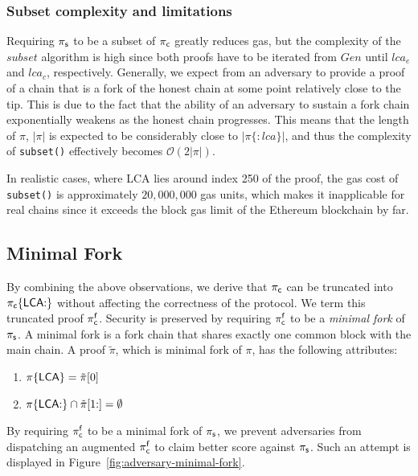 

\subsubsection{Subset complexity and limitations}

Requiring $\mathsf{\pi_{s}}$ to be a subset of $\mathsf{\pi_{c}}$ greatly reduces gas, but
the complexity of the $subset$ algorithm is high since both proofs have to be
iterated from $Gen$ until $lca_e$ and $lca_c$, respectively. Generally, we
expect from an adversary to provide a proof of a chain that is a fork of the
honest chain at some point relatively close to the tip. This is due to the fact
that the ability of an adversary to sustain a fork chain exponentially weakens
as the honest chain progresses. This means that the length of $\pi$, $|\pi|$ is
expected to be considerably close to $|\pi\{{:}lca\}|$, and thus the complexity of
\texttt{subset()} effectively becomes $\mathcal{O}(2|\pi|)$.

In realistic cases, where LCA lies around index 250 of the proof, the gas cost
of \texttt{subset()} is approximately $20{,}000{,}000$ gas units, which makes it
inapplicable for real chains since it exceeds the block gas limit of the
Ethereum blockchain by far.

\subsection{Minimal Fork} By combining the above observations, we
derive that $\mathsf{\pi_{c}}$ can be truncated into $\mathsf{\pi_{c}}\{\mathsf{LCA}{:}\}$ without affecting
the correctness of the protocol. We term this truncated proof $\mathsf{\pi_{c}^{f}}$.
Security is preserved by requiring $\mathsf{\pi_{c}^{f}}$ to be a \emph{minimal fork} of
$\mathsf{\pi_{s}}$. A minimal fork is a fork chain that shares exactly one common block
with the main chain. A proof $\tilde\pi$, which is minimal fork of $\pi$, has
the following attributes:

\begin{enumerate}
\item $\pi\{\mathsf{LCA}\} = \tilde\pi[0]$
\item $\pi\{\mathsf{LCA}{:}\} \cap \tilde\pi[1{:}] = \emptyset$
\end{enumerate}

By requiring $\mathsf{\pi_{c}^{f}}$ to be a minimal fork of $\mathsf{\pi_{s}}$, we prevent adversaries
from dispatching an augmented $\mathsf{\pi_{c}^{f}}$ to claim better score against $\mathsf{\pi_{s}}$.
Such an attempt is displayed in Figure~\ref{fig:adversary-minimal-fork}.

